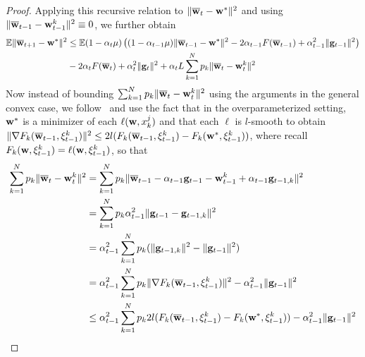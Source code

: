 \begin{proof}
	Applying this recursive relation to $\|{\overline{\mathbf{w}}}_{t}-{\mathbf{w}}^{\ast}\|^{2}$
	and using $\|{\overline{\mathbf{w}}}_{t-1}-{\mathbf{w}}_{t-1}^{k}\|^{2}\equiv0$, we further
	obtain 
	\begin{align*}
	\mathbb{E}\|{\overline{\mathbf{w}}}_{t+1}-{\mathbf{w}}^{\ast}\|^{2} & \leq\mathbb{E}(1-\alpha_{t}\mu)\left((1-\alpha_{t-1}\mu)\|{\overline{\mathbf{w}}}_{t-1}-{\mathbf{w}}^{\ast}\|^{2}-2\alpha_{t-1}F({\overline{\mathbf{w}}}_{t-1})+\alpha_{t-1}^{2}\|{\mathbf{g}}_{t-1}\|^{2}\right)\\
	& -2\alpha_{t}F({\overline{\mathbf{w}}}_{t})+\alpha_{t}^{2}\|{\mathbf{g}}_{t}\|^{2}+\alpha_{t}L\sum_{k=1}^{N}p_{k}\|{\overline{\mathbf{w}}}_{t}-{\mathbf{w}}_{t}^{k}\|^{2}
	\end{align*}
	Now instead of bounding $\sum_{k=1}^{N}p_{k}\|{\overline{\mathbf{w}}}_{t}-{\mathbf{w}}_{t}^{k}\|^{2}$
	using the arguments in the general convex case, we follow~\cite{ma2017power} and use the fact that
	in the overparameterized setting, ${\mathbf{w}}^{\ast}$ is a minimizer of each
	$\ell({\mathbf{w}},x_{k}^{j})$ and that each $\ell$ is $l$-smooth to obtain
	$\|\nabla F_{k}({\overline{\mathbf{w}}}_{t-1},\xi_{t-1}^{k})\|^{2}\leq2l(F_{k}({\overline{\mathbf{w}}}_{t-1},\xi_{t-1}^{k})-F_{k}({\mathbf{w}}^{\ast},\xi_{t-1}^{k}))$,
	where recall $F_{k}({\mathbf{w}},\xi_{t-1}^{k})=\ell({\mathbf{w}},\xi_{t-1}^{k})$, so that
	\begin{align*}
	\sum_{k=1}^{N}p_{k}\|{\overline{\mathbf{w}}}_{t}-{\mathbf{w}}_{t}^{k}\|^{2} & =\sum_{k=1}^{N}p_{k}\|{\overline{\mathbf{w}}}_{t-1}-\alpha_{t-1}{\mathbf{g}}_{t-1}-{\mathbf{w}}_{t-1}^{k}+\alpha_{t-1}{\mathbf{g}}_{t-1,k}\|^{2}\\
	& =\sum_{k=1}^{N}p_{k}\alpha_{t-1}^{2}\|{\mathbf{g}}_{t-1}-{\mathbf{g}}_{t-1,k}\|^{2}\\
	& =\alpha_{t-1}^{2}\sum_{k=1}^{N}p_{k}(\|{\mathbf{g}}_{t-1,k}\|^{2}-\|{\mathbf{g}}_{t-1}\|^{2})\\
	& =\alpha_{t-1}^{2}\sum_{k=1}^{N}p_{k}\|\nabla F_{k}({\overline{\mathbf{w}}}_{t-1},\xi_{t-1}^{k})\|^{2}-\alpha_{t-1}^{2}\|{\mathbf{g}}_{t-1}\|^{2}\\
	& \le\alpha_{t-1}^{2}\sum_{k=1}^{N}p_{k}2l(F_{k}({\overline{\mathbf{w}}}_{t-1},\xi_{t-1}^{k})-F_{k}({\mathbf{w}}^{\ast},\xi_{t-1}^{k}))-\alpha_{t-1}^{2}\|{\mathbf{g}}_{t-1}\|^{2}
	\end{align*}
	\begin{comment}
	(In the Nesterov case)
	\begin{align*}
	\mathbf{v}_{t+1}^{k} & =\mathbf{w}_{t}^{k}-\alpha_{t}\mathbf{g}_{t,k}\\
	\mathbf{w}_{t+1}^{k} & =\begin{cases}
	\mathbf{v}_{t+1}^{k}+\beta_{t}(\mathbf{v}_{t+1}^{k}-\mathbf{v}_{t}^{k}) & \text{if }t+1\notin\mathcal{I}_{E}\\
	\sum_{k=1}^{N}p_{k}\left[\mathbf{v}_{t+1}^{k}+\beta_{t}(\mathbf{v}_{t+1}^{k}-\mathbf{v}_{t}^{k})\right] & \text{if }t+1\in\mathcal{I}_{E}

\end{comment}
\end{proof}
